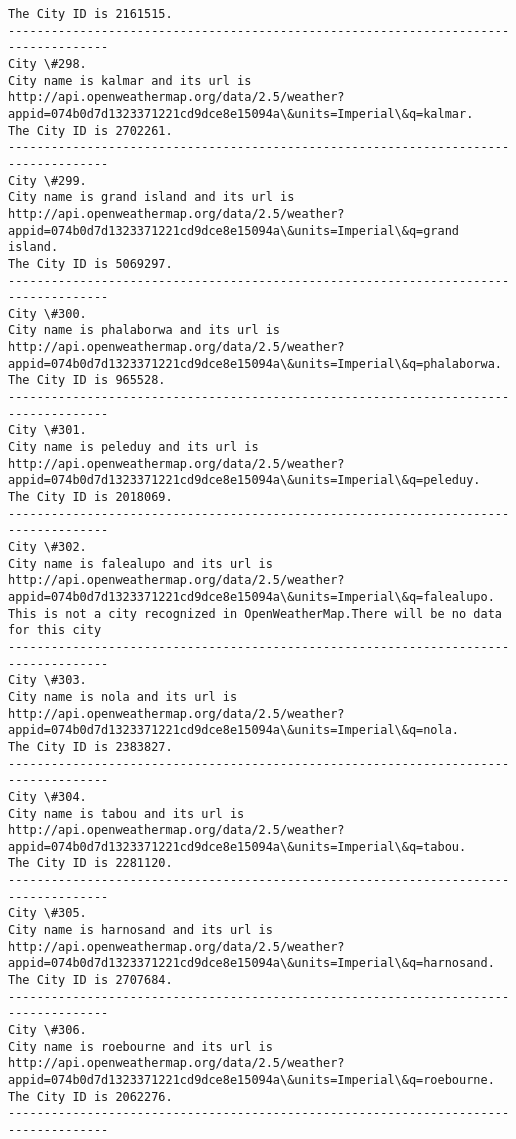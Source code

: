 \documentclass[11pt]{article}
\begin{document}
\begin{Verbatim}[commandchars=\\\{\}]
The City ID is 2161515.
------------------------------------------------------------------------------------
City \#298.
City name is kalmar and its url is http://api.openweathermap.org/data/2.5/weather?appid=074b0d7d1323371221cd9dce8e15094a\&units=Imperial\&q=kalmar.
The City ID is 2702261.
------------------------------------------------------------------------------------
City \#299.
City name is grand island and its url is http://api.openweathermap.org/data/2.5/weather?appid=074b0d7d1323371221cd9dce8e15094a\&units=Imperial\&q=grand island.
The City ID is 5069297.
------------------------------------------------------------------------------------
City \#300.
City name is phalaborwa and its url is http://api.openweathermap.org/data/2.5/weather?appid=074b0d7d1323371221cd9dce8e15094a\&units=Imperial\&q=phalaborwa.
The City ID is 965528.
------------------------------------------------------------------------------------
City \#301.
City name is peleduy and its url is http://api.openweathermap.org/data/2.5/weather?appid=074b0d7d1323371221cd9dce8e15094a\&units=Imperial\&q=peleduy.
The City ID is 2018069.
------------------------------------------------------------------------------------
City \#302.
City name is falealupo and its url is http://api.openweathermap.org/data/2.5/weather?appid=074b0d7d1323371221cd9dce8e15094a\&units=Imperial\&q=falealupo.
This is not a city recognized in OpenWeatherMap.There will be no data for this city
------------------------------------------------------------------------------------
City \#303.
City name is nola and its url is http://api.openweathermap.org/data/2.5/weather?appid=074b0d7d1323371221cd9dce8e15094a\&units=Imperial\&q=nola.
The City ID is 2383827.
------------------------------------------------------------------------------------
City \#304.
City name is tabou and its url is http://api.openweathermap.org/data/2.5/weather?appid=074b0d7d1323371221cd9dce8e15094a\&units=Imperial\&q=tabou.
The City ID is 2281120.
------------------------------------------------------------------------------------
City \#305.
City name is harnosand and its url is http://api.openweathermap.org/data/2.5/weather?appid=074b0d7d1323371221cd9dce8e15094a\&units=Imperial\&q=harnosand.
The City ID is 2707684.
------------------------------------------------------------------------------------
City \#306.
City name is roebourne and its url is http://api.openweathermap.org/data/2.5/weather?appid=074b0d7d1323371221cd9dce8e15094a\&units=Imperial\&q=roebourne.
The City ID is 2062276.
------------------------------------------------------------------------------------

\end{Verbatim}
\end{document}
